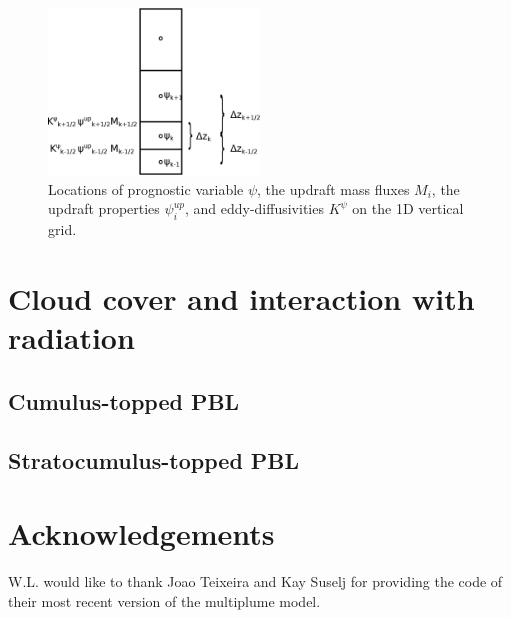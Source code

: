\documentclass[dvipdfmx,a4paper,10pt]{article}
\begin{document}
 

\begin{figure}[bthp]
\centering
 \includegraphics[width=0.5\textwidth]{staggering.eps}
\caption{Locations of prognostic variable $\psi$, the updraft mass fluxes $M_i$, the updraft properties $\psi^{up}_i$, and eddy-diffusivities $K^{\psi}$ on the 1D vertical grid. } \label{fig:staggering}
\end{figure}



\section{Cloud cover and interaction with radiation}\label{sec:clouds}

\subsection{Cumulus-topped PBL}

\subsection{Stratocumulus-topped PBL}



\section{Acknowledgements}
W.L. would like to thank Joao Teixeira and Kay Suselj for providing the code of their most recent version of the multiplume model. 




%

 
\end{document}
